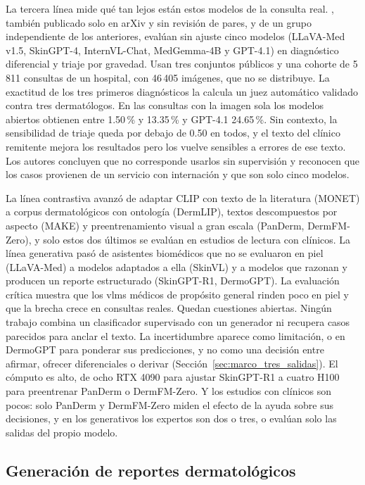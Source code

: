 La tercera línea mide qué tan lejos están estos modelos de la consulta real. \textcite{jiang2026multimodal}, también
publicado solo en arXiv y sin revisión de pares, y de un grupo independiente de los anteriores, evalúan sin ajuste
cinco modelos (LLaVA-Med v1.5, SkinGPT-4, InternVL-Chat, MedGemma-4B y GPT-4.1) en diagnóstico diferencial y triaje por
gravedad. Usan tres conjuntos públicos y una cohorte de 5\,811 consultas de un hospital, con 46\,405 imágenes, que no
se distribuye. La exactitud de los tres primeros diagnósticos la calcula un juez automático validado contra tres
dermatólogos. En las consultas con la imagen sola los modelos abiertos obtienen entre 1.50\,\% y 13.35\,\% y GPT-4.1
24.65\,\%. Sin contexto, la sensibilidad de triaje queda por debajo de 0.50 en todos, y el texto del clínico remitente
mejora los resultados pero los vuelve sensibles a errores de ese texto. Los autores concluyen que no corresponde
usarlos sin supervisión y reconocen que los casos provienen de un servicio con internación y que son solo cinco
modelos.

La línea contrastiva avanzó de adaptar CLIP con texto de la literatura (MONET) a corpus dermatológicos con ontología
(DermLIP), textos descompuestos por aspecto (MAKE) y preentrenamiento visual a gran escala (PanDerm, DermFM-Zero), y
solo estos dos últimos se evalúan en estudios de lectura con clínicos. La línea generativa pasó de asistentes biomédicos que no se evaluaron en
piel (LLaVA-Med) a modelos adaptados a ella (SkinVL) y a modelos que razonan y producen un reporte estructurado
(SkinGPT-R1, DermoGPT). La evaluación crítica muestra que los \glspl{vlm} médicos de propósito general rinden poco en
piel y que la brecha crece en consultas reales. Quedan cuestiones abiertas.
Ningún trabajo combina un clasificador supervisado con un generador ni recupera casos parecidos para anclar el texto.
La incertidumbre aparece como limitación, o en DermoGPT para ponderar sus predicciones, y no como una decisión
entre afirmar, ofrecer diferenciales o derivar (Sección~\ref{sec:marco_tres_salidas}). El cómputo es alto, de ocho RTX 4090 para ajustar SkinGPT-R1 a cuatro H100 para
preentrenar PanDerm o DermFM-Zero. Y los estudios con clínicos son pocos: solo PanDerm y DermFM-Zero miden el efecto de
la ayuda sobre sus decisiones, y en los generativos los expertos son dos o tres, o evalúan solo las salidas del propio modelo.

\FloatBarrier
\subsection{Generación de reportes dermatológicos}
\label{sec:estado_arte_reportes}

